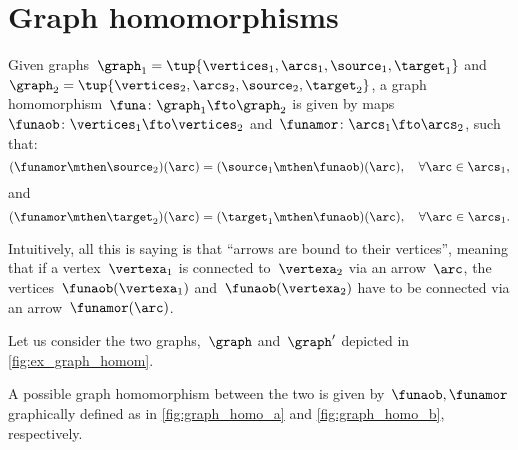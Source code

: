 
\section{Graph homomorphisms}
\begin{definition}
	\label{def:graph_homom}
	Given graphs~$\graph_1=\tup{\vertices_1,\arcs_1,\source_1,\target_1}$ and~$\graph_2=\tup{\vertices_2,\arcs_2,\source_2,\target_2}$, a graph homomorphism~$\funa \colon \graph_1 \fto \graph_2$ is given by maps~$\funaob\colon \vertices_1 \fto \vertices_2$ and~$\funamor\colon \arcs_1 \fto \arcs_2$, such that:
	\begin{equation}
		(\funamor \mthen \source_2)(\arc)=(\source_1\mthen \funaob)(\arc), \quad \forall \arc\in \arcs_1,
	\end{equation}
	and
	\begin{equation}
		(\funamor \mthen \target_2)(\arc)=(\target_1\mthen \funaob)(\arc), \quad \forall \arc\in \arcs_1.
	\end{equation}
\end{definition}

\begin{remark}
	Intuitively, all this is saying is that ``arrows are bound to their vertices'', meaning that if a vertex~$\vertexa_1$ is connected to~$\vertexa_2$ via an arrow~$\arc$, the vertices~$\funaob(\vertexa_1)$ and~$\funaob(\vertexa_2)$ have to be connected via an arrow~$\funamor(\arc)$.
\end{remark}

\begin{example}
	\label{exa:homomorphism_graph_positive}
	Let us consider the two graphs,~$\graph$ and~$\graph'$ depicted in \cref{fig:ex_graph_homom}.
	\begin{figure*}[h]
		\centering
		\caption{Example of graphs for graph homomorphism.}
		\label{fig:ex_graph_homom}
	\end{figure*}

	\begin{marginfigure}
		\begin{center}
		\end{center}
		\caption{\label{fig:graph_homo_a}}
	\end{marginfigure}

	\begin{marginfigure}
		\begin{center}
			\includesag{graph_homo_b}
		\end{center}
		\caption{\label{fig:graph_homo_b}}
	\end{marginfigure}
	A possible graph homomorphism between the two is given by~$\funaob,\funamor$ graphically defined as in \cref{fig:graph_homo_a} and \cref{fig:graph_homo_b}, respectively.
\end{example}

